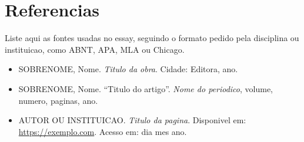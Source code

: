 \section*{Referencias}

Liste aqui as fontes usadas no essay, seguindo o formato pedido pela disciplina
ou instituicao, como ABNT, APA, MLA ou Chicago.

\begin{itemize}
  \item SOBRENOME, Nome. \textit{Titulo da obra}. Cidade: Editora, ano.
  \item SOBRENOME, Nome. ``Titulo do artigo''. \textit{Nome do periodico},
  volume, numero, paginas, ano.
  \item AUTOR OU INSTITUICAO. \textit{Titulo da pagina}. Disponivel em:
  \url{https://exemplo.com}. Acesso em: dia mes ano.
\end{itemize}
